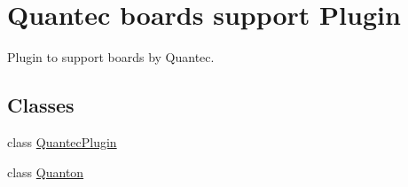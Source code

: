 \hypertarget{group___boards___quantec}{\section{\-Quantec boards support \-Plugin}
\label{group___boards___quantec}
}


\-Plugin to support boards by \-Quantec.  


\subsection*{\-Classes}
\begin{DoxyCompactItemize}
\item 
class \hyperlink{class_quantec_plugin}{\-Quantec\-Plugin}
\item 
class \hyperlink{class_quanton}{\-Quanton}
\end{DoxyCompactItemize}
